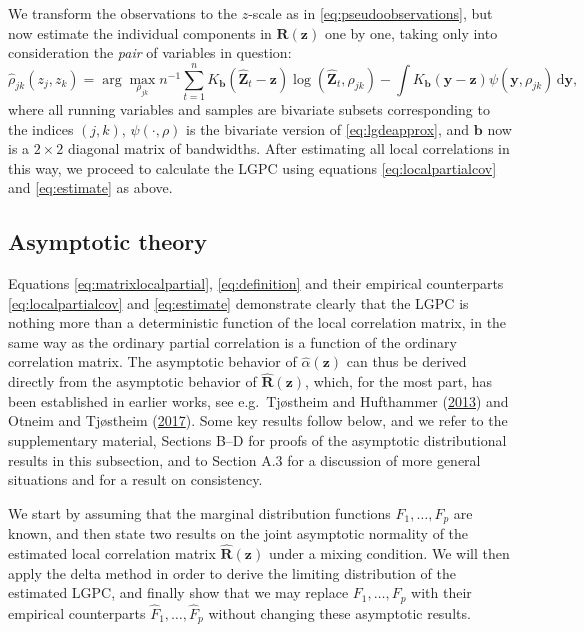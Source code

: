 \documentclass[
  12pt,
  letterpaper]{article}
\newcommand{\z}{\bm{z}}
\newcommand{\hZ}{\widehat{\bm{Z}}}
\newcommand{\y}{\bm{y}}
\newcommand{\R}{\bm{R}}
\newcommand{\hR}{\widehat{\bm{R}}}
\newcommand{\hF}{\widehat{F}}
\newcommand{\hrho}{\widehat{\rho}}
\newcommand{\hh}{\bm{b}}
\newcommand{\halpha}{\widehat{\alpha}}
\theoremstyle{definition}
\theoremstyle{definition}
\theoremstyle{definition}
\theoremstyle{remark}
\begin{document}
We transform the observations to the \(z\)-scale as in \eqref{eq:pseudoobservations}, but now estimate the individual components in \(\R(\z)\) one by one, taking only into consideration the \emph{pair} of variables in question:
\begin{equation}
\hrho_{jk}(z_j, z_k) = \arg\max_{\rho_{jk}} n^{-1} \sum_{t=1}^nK_{\hh}(\hZ_t - \z)\log(\hZ_t, \rho_{jk}) - \int K_{\hh}(\y - \z)\psi(\y, \rho_{jk})\,\textrm{d}\y, 
\label{eq:locallik2}
\end{equation}
where all running variables and samples are bivariate subsets corresponding to the indices \((j,k)\), \(\psi(\cdot, \rho)\) is the bivariate version of \eqref{eq:lgdeapprox}, and \(\hh\) now is a \(2\times2\) diagonal matrix of bandwidths. After estimating all local correlations in this way, we proceed to calculate the LGPC using equations \eqref{eq:localpartialcov} and \eqref{eq:estimate} as above.

\hypertarget{chap:asymptotic}{%
\subsection{Asymptotic theory}\label{chap:asymptotic}}

Equations \eqref{eq:matrixlocalpartial}, \eqref{eq:definition} and their empirical counterparts \eqref{eq:localpartialcov} and \eqref{eq:estimate} demonstrate clearly that the LGPC is nothing more than a deterministic function of the local correlation matrix, in the same way as the ordinary partial correlation is a function of the ordinary correlation matrix. The asymptotic behavior of \(\halpha(\z)\) can thus be derived directly from the asymptotic behavior of \(\hR(\z)\), which, for the most part, has been established in earlier works, see e.g.~Tjøstheim and Hufthammer (\protect\hyperlink{ref-tjostheim2013local}{2013}) and Otneim and Tjøstheim (\protect\hyperlink{ref-otneim2017locally}{2017}). Some key results follow below, and we refer to the supplementary material, Sections B--D for proofs of the asymptotic distributional results in this subsection, and to Section A.3 for a discussion of more general situations and for a result on consistency.

We start by assuming that the marginal distribution functions \(F_1, \ldots, F_p\) are known, and then state two results on the joint asymptotic normality of the estimated local correlation matrix \(\hR(\z)\) under a mixing condition. We will then apply the delta method in order to derive the limiting distribution of the estimated LGPC, and finally show that we may replace \(F_1,\ldots,F_p\) with their empirical counterparts \(\hF_1,\ldots,\hF_p\) without changing these asymptotic results.
\end{document}
